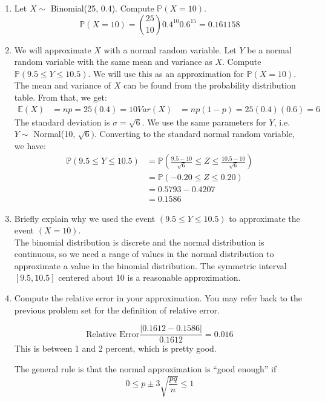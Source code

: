 \documentclass[12pt]{article}
\def\P{{\mathbb P}}
\def\E{{\mathbb E}}
\begin{document}
\begin{enumerate}
\begin{enumerate}
\item Let $X \sim$ Binomial(25, 0.4). Compute $\P(X = 10)$.\\

\[
\P(X = 10) = \binom{25}{10}0.4^{10}0.6^{15} = 0.161158
\]

\item We will approximate $X$ with a normal random variable. Let $Y$ be a normal random variable with the same mean and variance as $X$. Compute $\P(9.5 \leq Y \leq 10.5)$. We will use this as an approximation for $\P(X = 10)$.\\

The mean and variance of $X$ can be found from the probability distribution table. From that, we get:
\begin{align*}
\E(X) &= np = 25(0.4) = 10
Var(X) &= np(1-p) = 25(0.4)(0.6) = 6
\end{align*}
The standard deviation is $\sigma = \sqrt{6}$. We use the same parameters for $Y$, i.e. $Y \sim$ Normal(10, $\sqrt{6})$. Converting to the standard normal random variable, we have:
\begin{align*}
\P(9.5 \leq Y \leq 10.5) &= \P\left( \frac{9.5 - 10}{\sqrt{6}} \leq Z \leq \frac{10.5 - 10}{\sqrt{6}} \right) \\
&= \P\left( -0.20 \leq Z \leq 0.20 \right) \\
&= 0.5793 - 0.4207 \\
&= 0.1586
\end{align*}

\item Briefly explain why we used the event $(9.5 \leq Y \leq 10.5)$ to approximate the event $(X = 10)$.\\

The binomial distribution is discrete and the normal distribution is continuous, so we need a range of values in the normal distribution to approximate a value in the binomial distribution. The symmetric interval $[9.5, 10.5]$ centered about 10 is a reasonable approximation.

\item Compute the relative error in your approximation. You may refer back to the previous problem set for the definition of relative error.

\[
\text{Relative Error} \frac{| 0.1612 - 0.1586 |}{0.1612} = 0.016
\]
This is between 1 and 2 percent, which is pretty good.

The general rule is that the normal approximation is ``good enough'' if
\[
0 \leq p \pm 3 \sqrt{\frac{pq}{n}} \leq 1
\]


\end{enumerate}
\end{enumerate}
\end{document}
